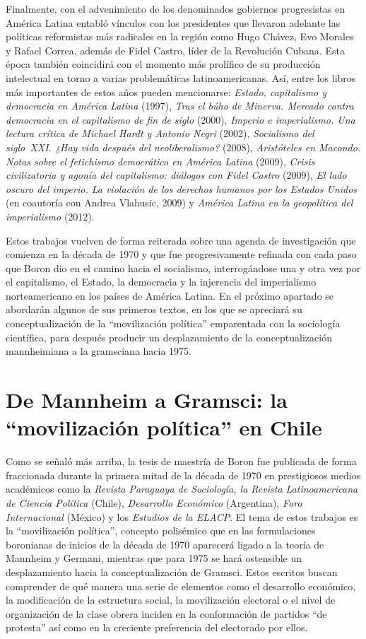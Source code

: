 Finalmente, con el advenimiento de los denominados gobiernos progresistas en América Latina entabló vínculos con los presidentes que llevaron adelante las políticas reformistas más radicales en la región como Hugo Chávez, Evo Morales y Rafael Correa, además de Fidel Castro, líder de la Revolución Cubana. Esta época también coincidirá con el momento más prolífico de su producción intelectual en torno a varias problemáticas latinoamericanas. Así, entre los libros más importantes de estos años pueden mencionarse: \emph{Estado, capitalismo y democracia en América Latina} (1997), \emph{Tras el búho de Minerva. Mercado contra democracia en el capitalismo de fin de siglo} (2000), \emph{Imperio e imperialismo. Una lectura crítica de Michael Hardt y Antonio Negri} (2002), \emph{Socialismo del siglo~XXI. ¿Hay vida después del neoliberalismo?} (2008), \emph{Aristóteles en Macondo. Notas sobre el fetichismo democrático en América Latina} (2009), \emph{Crisis civilizatoria y agonía del capitalismo: diálogos con Fidel Castro} (2009), \emph{El lado oscuro del imperio. La violación de los derechos humanos por los Estados Unidos} (en coautoría con Andrea Vlahusic, 2009) y \emph{América Latina en la geopolítica del imperialismo} (2012).

Estos trabajos vuelven de forma reiterada sobre una agenda de investigación que comienza en la década de 1970 y que fue progresivamente refinada con cada paso que Boron dio en el camino hacia el socialismo, interrogándose una y otra vez por el capitalismo, el Estado, la democracia y la injerencia del imperialismo norteamericano en los países de América Latina. En el próximo apartado se abordarán algunos de sus primeros textos, en los que se apreciará su conceptualización de la ``movilización política'' emparentada con la sociología científica, para después producir un desplazamiento de la conceptualización mannheimiana a la gramsciana hacia 1975.

\section{De Mannheim a Gramsci: la ``movilización política'' en Chile}

Como se señaló más arriba, la tesis de maestría de Boron fue publicada de forma fraccionada durante la primera mitad de la década de 1970 en prestigiosos medios académicos como la \emph{Revista Paraguaya de Sociología, la Revista Latinoamericana de Ciencia Política} (Chile), \emph{Desarrollo Económico} (Argentina), \emph{Foro Internacional} (México) y los \emph{Estudios de la ELACP}. El tema de estos trabajos es la ``movilización política'', concepto polisémico que en las formulaciones boronianas de inicios de la década de 1970 aparecerá ligado a la teoría de Mannheim y Germani, mientras que para 1975 se hará ostensible un desplazamiento hacia la conceptualización de Gramsci. Estos escritos buscan comprender de qué manera una serie de elementos como el desarrollo económico, la modificación de la estructura social, la movilización electoral o el nivel de organización de la clase obrera inciden en la conformación de partidos ``de protesta'' así como en la creciente preferencia del electorado por ellos.

